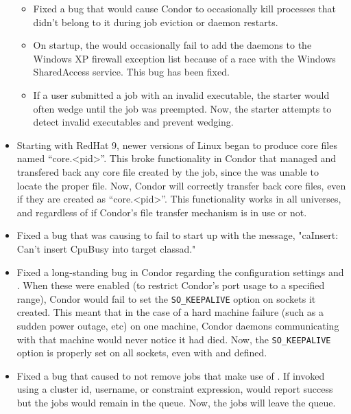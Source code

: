 \begin{itemize}
\begin{itemize}
\item Fixed a bug that would cause Condor to occasionally kill processes
that didn't belong to it during job eviction or daemon restarts.

\item On startup, the  would occasionally fail to add the
daemons to the Windows XP firewall exception list because of a race with
the Windows SharedAccess service. This bug has been fixed.

\item If a user submitted a job with an invalid executable, the starter
would often wedge until the job was preempted. Now, the starter attempts
to detect invalid executables and prevent wedging.

\end{itemize}

\item Starting with RedHat 9, newer versions of Linux began to produce
  core files named ``core.<pid>''.
  This broke functionality in Condor that managed and transfered back
  any core file created by the job, since the  was
  unable to locate the proper file.
  Now, Condor will correctly transfer back core files, even if they
  are created as ``core.<pid>''.
  This functionality works in all universes, and regardless of if
  Condor's file transfer mechanism is in use or not.


\item Fixed a bug that was causing  to fail to start up
with the message, "caInsert: Can't insert CpuBusy into target classad."

\item Fixed a long-standing bug in Condor regarding the configuration
  settings  and .
  When these were enabled (to restrict Condor's port usage to a
  specified range), Condor would fail to set the
  \texttt{SO\_KEEPALIVE} option on sockets it created.
  This meant that in the case of a hard machine failure (such as a
  sudden power outage, etc) on one machine, Condor daemons
  communicating with that machine would never notice it had died.
  Now, the \texttt{SO\_KEEPALIVE} option is properly set on all
  sockets, even with  and 
  defined. 

\item Fixed a bug that caused   to not remove
  jobs that make use of .
  If invoked using a cluster id, username, or constraint expression,
   would report success but the jobs would remain in the queue.
  Now, the jobs will leave the queue.


\end{itemize}
